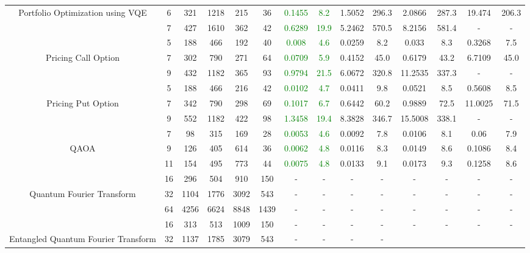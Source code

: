 \begin{table}[htb]
{\begin{tabular}{|c|c|c|c|c|c|c|c|c|c|c|c|c|c|}
Portfolio Optimization using VQE & 
6 & 321 & 1218 & 215 & 36
 & \textcolor{green}{0.1455} & \textcolor{green}{8.2}
 & 1.5052 & 296.3
 & 2.0866 & 287.3
 & 19.474 & 206.3
 \\
 & 
7 & 427 & 1610 & 362 & 42
 & \textcolor{green}{0.6289} & \textcolor{green}{19.9}
 & 5.2462 & 570.5
 & 8.2156 & 581.4
 & - & -
 \\
\hline
 & 
5 & 188 & 466 & 192 & 40
 & \textcolor{green}{0.008} & \textcolor{green}{4.6}
 & 0.0259 & 8.2
 & 0.033 & 8.3
 & 0.3268 & 7.5
 \\
Pricing Call Option & 
7 & 302 & 790 & 271 & 64
 & \textcolor{green}{0.0709} & \textcolor{green}{5.9}
 & 0.4152 & 45.0
 & 0.6179 & 43.2
 & 6.7109 & 45.0
 \\
 & 
9 & 432 & 1182 & 365 & 93
 & \textcolor{green}{0.9794} & \textcolor{green}{21.5}
 & 6.0672 & 320.8
 & 11.2535 & 337.3
 & - & -
 \\
\hline
 & 
5 & 188 & 466 & 216 & 42
 & \textcolor{green}{0.0102} & \textcolor{green}{4.7}
 & 0.0411 & 9.8
 & 0.0521 & 8.5
 & 0.5608 & 8.5
 \\
Pricing Put Option & 
7 & 342 & 790 & 298 & 69
 & \textcolor{green}{0.1017} & \textcolor{green}{6.7}
 & 0.6442 & 60.2
 & 0.9889 & 72.5
 & 11.0025 & 71.5
 \\
 & 
9 & 552 & 1182 & 422 & 98
 & \textcolor{green}{1.3458} & \textcolor{green}{19.4}
 & 8.3828 & 346.7
 & 15.5008 & 338.1
 & - & -
 \\
\hline
 & 
7 & 98 & 315 & 169 & 28
 & \textcolor{green}{0.0053} & \textcolor{green}{4.6}
 & 0.0092 & 7.8
 & 0.0106 & 8.1
 & 0.06 & 7.9
 \\
QAOA & 
9 & 126 & 405 & 614 & 36
 & \textcolor{green}{0.0062} & \textcolor{green}{4.8}
 & 0.0116 & 8.3
 & 0.0149 & 8.6
 & 0.1086 & 8.4
 \\
 & 
11 & 154 & 495 & 773 & 44
 & \textcolor{green}{0.0075} & \textcolor{green}{4.8}
 & 0.0133 & 9.1
 & 0.0173 & 9.3
 & 0.1258 & 8.6
 \\
\hline
 & 
16 & 296 & 504 & 910 & 150
 & - & -
 & - & -
 & - & -
 & - & -
 \\
Quantum Fourier Transform & 
32 & 1104 & 1776 & 3092 & 543
 & - & -
 & - & -
 & - & -
 & - & -
 \\
 & 
64 & 4256 & 6624 & 8848 & 1439
 & - & -
 & - & -
 & - & -
 & - & -
 \\
\hline
 & 
16 & 313 & 513 & 1009 & 150
 & - & -
 & - & -
 & - & -
 & - & -
 \\
Entangled Quantum Fourier Transform & 
32 & 1137 & 1785 & 3079 & 543
 & - & -
 & - & -

\end{tabular}}
\end{table}
